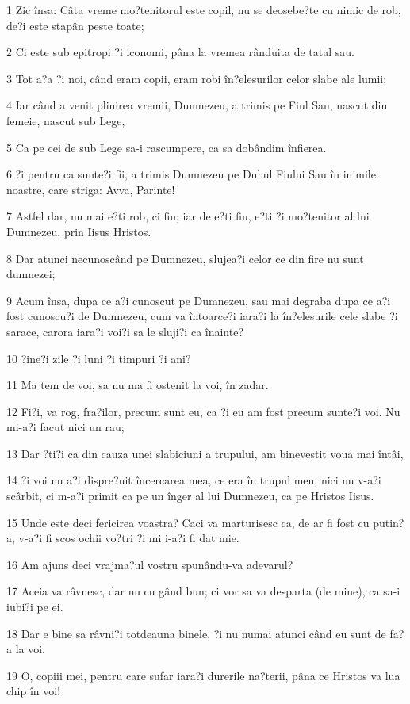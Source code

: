 \par 1 Zic însa: Câta vreme mo?tenitorul este copil, nu se deosebe?te cu nimic de rob, de?i este stapân peste toate;
\par 2 Ci este sub epitropi ?i iconomi, pâna la vremea rânduita de tatal sau.
\par 3 Tot a?a ?i noi, când eram copii, eram robi în?elesurilor celor slabe ale lumii;
\par 4 Iar când a venit plinirea vremii, Dumnezeu, a trimis pe Fiul Sau, nascut din femeie, nascut sub Lege,
\par 5 Ca pe cei de sub Lege sa-i rascumpere, ca sa dobândim înfierea.
\par 6 ?i pentru ca sunte?i fii, a trimis Dumnezeu pe Duhul Fiului Sau în inimile noastre, care striga: Avva, Parinte!
\par 7 Astfel dar, nu mai e?ti rob, ci fiu; iar de e?ti fiu, e?ti ?i mo?tenitor al lui Dumnezeu, prin Iisus Hristos.
\par 8 Dar atunci necunoscând pe Dumnezeu, slujea?i celor ce din fire nu sunt dumnezei;
\par 9 Acum însa, dupa ce a?i cunoscut pe Dumnezeu, sau mai degraba dupa ce a?i fost cunoscu?i de Dumnezeu, cum va întoarce?i iara?i la în?elesurile cele slabe ?i sarace, carora iara?i voi?i sa le sluji?i ca înainte?
\par 10 ?ine?i zile ?i luni ?i timpuri ?i ani?
\par 11 Ma tem de voi, sa nu ma fi ostenit la voi, în zadar.
\par 12 Fi?i, va rog, fra?ilor, precum sunt eu, ca ?i eu am fost precum sunte?i voi. Nu mi-a?i facut nici un rau;
\par 13 Dar ?ti?i ca din cauza unei slabiciuni a trupului, am binevestit voua mai întâi,
\par 14 ?i voi nu a?i dispre?uit încercarea mea, ce era în trupul meu, nici nu v-a?i scârbit, ci m-a?i primit ca pe un înger al lui Dumnezeu, ca pe Hristos Iisus.
\par 15 Unde este deci fericirea voastra? Caci va marturisesc ca, de ar fi fost cu putin?a, v-a?i fi scos ochii vo?tri ?i mi i-a?i fi dat mie.
\par 16 Am ajuns deci vrajma?ul vostru spunându-va adevarul?
\par 17 Aceia va râvnesc, dar nu cu gând bun; ci vor sa va desparta (de mine), ca sa-i iubi?i pe ei.
\par 18 Dar e bine sa râvni?i totdeauna binele, ?i nu numai atunci când eu sunt de fa?a la voi.
\par 19 O, copiii mei, pentru care sufar iara?i durerile na?terii, pâna ce Hristos va lua chip în voi!
